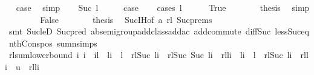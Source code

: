 \begin{isabellebody}
\ \isamarkupfalse%
\ {\isacharquery}case\ \isamarkupfalse%
\ simp\isanewline
{}\isamarkupfalse%
\isanewline
\ \ \isamarkupfalse%
\ {\isacharparenleft}Suc\ l{\isacharparenright}\isanewline
\ \ \isamarkupfalse%
\ \isamarkupfalse%
\ {\isacharquery}case\isanewline
\ \ \isamarkupfalse%
\ {\isacharparenleft}cases\ {\isachardoublequoteopen}l{\isacharequal}{}{\isachardoublequoteclose}{\isacharparenright}\isanewline
\ \ \ \ \isamarkupfalse%
\ True\isanewline
\ \ \ \ \isamarkupfalse%
\ \isamarkupfalse%
\ {\isacharquery}thesis\ \isamarkupfalse%
\ simp\isanewline
\ \ \isamarkupfalse%
\isanewline
\ \ \ \ \isamarkupfalse%
\ False\isanewline
\ \ \ \ \isamarkupfalse%
\ \isamarkupfalse%
\ {\isacharquery}thesis\ \isamarkupfalse%
\ Suc{\isachardot}IH{\isacharbrackleft}of\ a\ rl{\isacharbrackright}\ Suc{\isachardot}prems\isanewline
\ \ \ \ \ \ \isamarkupfalse%
\ {\isacharparenleft}smt\ Suc{\isacharunderscore}leD\ Suc{\isacharunderscore}pred\ ab{\isacharunderscore}semigroup{\isacharunderscore}add{\isacharunderscore}class{\isachardot}add{\isacharunderscore}ac{\isacharparenleft}{}{\isacharparenright}\ add{\isachardot}commute\ diff{\isacharunderscore}Suc{\isacharunderscore}{}\ less{\isacharunderscore}Suc{\isacharunderscore}eq\ nth{\isacharunderscore}Cons{\isacharunderscore}pos\ sumn{\isachardot}simps{\isacharparenleft}{}{\isacharparenright}{\isacharparenright}\ \isanewline
\ \ \ \ \isamarkupfalse%
\isanewline
{}\isamarkupfalse%
%
\endisatagproof
{\isafoldproof}%
%
\isadelimproof
\isanewline
%
\endisadelimproof
\isanewline
{}\isamarkupfalse%
\ rl{\isacharunderscore}sum{\isacharunderscore}lower{\isacharunderscore}bound{\isacharcolon}\ {\isachardoublequoteopen}{\isasymforall}i{\isachardot}\ {}{\isasymle}i\ {\isasymand}\ i{\isasymle}l\ {\isasymlongrightarrow}\ {\isacharparenleft}l{\isacharminus}i\ {\isacharless}\ l{\isacharminus}{}\ {\isasymlongrightarrow}\ rl{\isacharbang}Suc\ {\isacharparenleft}l{\isacharminus}i{\isacharparenright}\ {\isacharplus}\ rl{\isacharbang}Suc\ {\isacharparenleft}Suc\ {\isacharparenleft}l{\isacharminus}i{\isacharparenright}{\isacharparenright}\ {\isacharless}\ rl{\isacharbang}{\isacharparenleft}l{\isacharminus}i{\isacharparenright}{\isacharparenright}\ {\isasymand}\ {\isacharparenleft}l{\isacharminus}i\ {\isacharless}\ l{\isacharminus}{}\ {\isasymlongrightarrow}\ rl{\isacharbang}Suc\ {\isacharparenleft}l{\isacharminus}i{\isacharparenright}\ {\isacharless}\ rl{\isacharbang}{\isacharparenleft}l{\isacharminus}i{\isacharparenright}{\isacharparenright}\ {\isasymand}\ u\ {\isasymle}\ rl{\isacharbang}{\isacharparenleft}l{\isacharminus}i{\isacharparenright}\ {\isasymLongrightarrow}\isanewline

\end{isabellebody}
